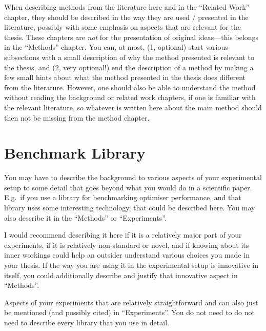 When describing methods from the literature here and in the ``Related Work'' chapter, they should be described in the way they are used / presented in the literature, possibly with some emphasis on aspects that are relevant for the thesis.
These chapters are \emph{not} for the presentation of original ideas---this belongs in the ``Methods'' chapter.
You can, at most, (1, optional) start various subsections with a small description of why the method presented is relevant to the thesis, and (2, very optional!) end the description of a method by making a few small hints about what the method presented in the thesis does different from the literature.
However, one should also be able to understand the method without reading the background or related work chapters, if one is familiar with the relevant literature, so whatever is written here about the main method should then not be missing from the method chapter.

\section{Benchmark Library}

You may have to describe the background to various aspects of your experimental setup to some detail that goes beyond what you would do in a scientific paper.
E.g.\ if you use a library for benchmarking optimiser performance, and that library uses some interesting technology, that could be described here.
You may also describe it in the ``Methods'' or ``Experiments''.

I would recommend describing it here if it is a relatively major part of your experiments, if it is relatively non-standard or novel, and if knowing about its inner workings could help an outsider understand various choices you made in your thesis.
If the way you are using it in the experimental setup is innovative in itself, you could additionally describe and justify that innovative aspect in ``Methods''.

Aspects of your experiments that are relatively straightforward and can also just be mentioned (and possibly cited) in ``Experiments''.
You do not need to do not need to describe every library that you use in detail.